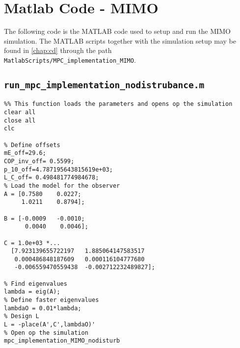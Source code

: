 \section{Matlab Code - MIMO}
The following code is the MATLAB code used to setup and run the MIMO simulation. The MATLAB scripts together with the simulation setup  may be found in \autoref{chap:cd} through the path \\ \texttt{MatlabScripts/MPC\_implementation\_MIMO}.
\subsection*{\texttt{run\_mpc\_implementation\_nodistrubance.m}}
\begin{lstlisting}
%% This function loads the parameters and opens op the simulation
clear all
close all
clc

% Define offsets
mE_off=29.6;
COP_inv_off= 0.5599;
p_10_off=4.787195643815619e+03;
L_C_off= 0.498481774984678;
% Load the model for the observer
A = [0.7580    0.0227;
     1.0211    0.8794];

B = [-0.0009   -0.0010;
      0.0040    0.0046];

C = 1.0e+03 *...
  [7.923139655722197   1.885064147583517
   0.000486848187609   0.000116104777680
   -0.006559470559438  -0.002712232489827];
 
% Find eigenvalues
lambda = eig(A);
% Define faster eigenvalues
lambdaO = 0.01*lambda; 
% Design L
L = -place(A',C',lambdaO)'
% Open op the simulation
mpc_implementation_MIMO_nodisturb

\end{lstlisting}

